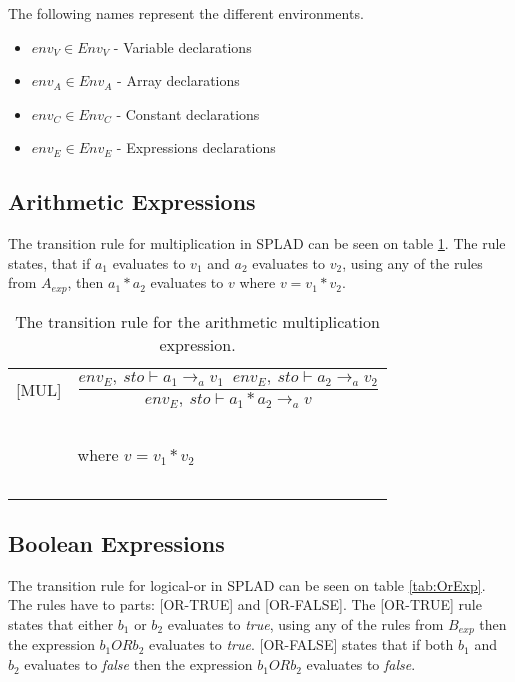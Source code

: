 The following names represent the different environments.
\begin{itemize}
\item $env_V \in Env_V$ - Variable declarations
\item $env_A \in Env_A$ - Array declarations
\item $env_C \in Env_C$ - Constant declarations
\item $env_E \in Env_E$ - Expressions declarations
\end{itemize}

\subsection{Arithmetic Expressions}
The transition rule for multiplication in SPLAD can be seen on table \ref{tab:MultExp}. The rule states, that if $a_1$ evaluates to $v_1$ and $a_2$ evaluates to $v_2$, using any of the rules from $A_{exp}$, then $a_1 * a_2$ evaluates to $v$ where $v = v_1 * v_2$.

\begin{table}[H]
\begin{tabular}{l l}
[MUL] & \[\frac{env_E, \: sto \vdash a_1 \rightarrow_a v_1 \;\; env_E, \: sto \vdash a_2 \rightarrow_a v_2}{env_E, \: sto \vdash a_1 * a_2 \rightarrow_a v}\] \\
~ & ~ \\
~ & \indent\indent where $v=v_1 * v_2$ \\ 
~ & ~ \\
\end{tabular}
\caption{The transition rule for the arithmetic multiplication expression.}
\label{tab:MultExp}
\end{table}

\subsection{Boolean Expressions}
The transition rule for logical-or in SPLAD can be seen on table \ref{tab:OrExp}. The rules have to parts: [OR-TRUE] and [OR-FALSE]. The [OR-TRUE] rule states that either $b_1$ or $b_2$ evaluates to \textit{true}, using any of the rules from $B_{exp}$ then the expression $b_1 OR b_2$ evaluates to \textit{true}. [OR-FALSE] states that if both $b_1$ and $b_2$ evaluates to \textit{false} then the expression $b_1 OR b_2$ evaluates to \textit{false}.

